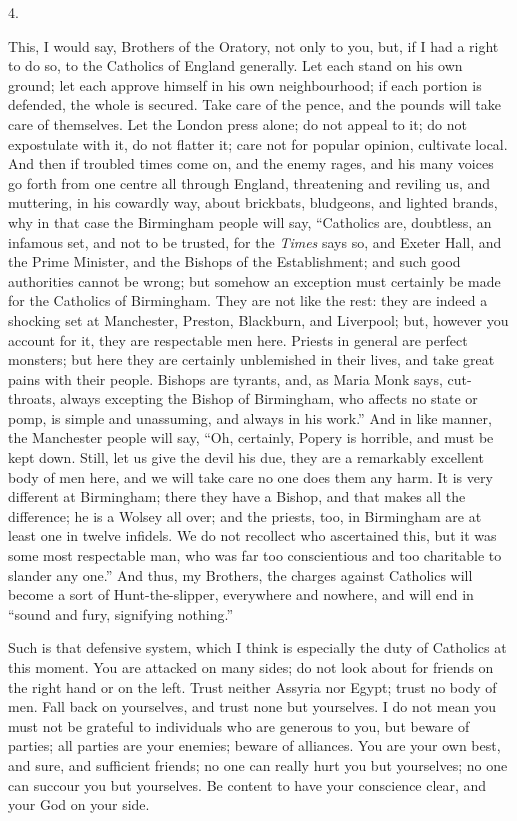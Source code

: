 4.

This, I would say, Brothers of the Oratory, not only
to you, but, if I had a right to do so, to the Catholics
of England generally. Let each stand on his own ground;
let each approve himself in his own neighbourhood; if
each portion is defended, the whole is secured. Take care
of the pence, and the pounds will take care of
themselves. Let the London press alone; do not appeal to
it; do not expostulate with it, do not flatter it; care
not for popular opinion, cultivate local. And then if
troubled times come on, and the enemy rages, and his many
voices go forth from one centre all through England,
threatening and reviling us, and muttering, in his
cowardly way, about brickbats, bludgeons, and lighted
brands, why in that case the Birmingham people will say,
``Catholics are, doubtless, an infamous set, and not
to be trusted, for the \emph{Times} says so, and Exeter
Hall, and the Prime Minister, and the Bishops of the
Establishment; and such good authorities cannot be wrong;
but somehow an exception must certainly be made for the
Catholics of Birmingham. They are not like the rest: they
are indeed a shocking set at Manchester, Preston,
Blackburn, and Liverpool; but, however you account for
it, they are respectable men here. Priests in general are
perfect monsters; but here they are certainly unblemished
in their lives, and take great pains with their people.
Bishops are tyrants, and, as Maria Monk says,
cut-throats, always excepting the Bishop of Birmingham,
who affects no state or pomp, is simple and unassuming,
and always in his work.'' And in like manner, the
Manchester people will say, ``Oh, certainly, Popery
is horrible, and must be kept down. Still, let us give
the devil his due, they are a remarkably excellent body
of men here, and we will take care no one does them any
harm. It is very different at Birmingham; there they have
a Bishop, and that makes all the difference; he is a
Wolsey all over; and the priests, too, in Birmingham are
at least one in twelve infidels. We do not recollect who
ascertained this, but it was some most respectable man,
who was far too conscientious and too charitable to
slander any one.'' And thus, my Brothers, the charges
against Catholics will become a sort of Hunt-the-slipper,
everywhere and nowhere, and will end in ``sound and
fury, signifying nothing.''

Such is that defensive system, which I think is
especially the duty of Catholics at this moment. You are
attacked on many sides; do not look about for friends on
the right hand or on the left. Trust neither Assyria nor
Egypt; trust no body of men. Fall back on yourselves, and
trust none but yourselves. I do not mean you must not be
grateful to individuals who are generous to you, but
beware of parties; all parties are your enemies; beware
of alliances. You are your own best, and sure, and
sufficient friends; no one can really hurt you but
yourselves; no one can succour you but yourselves. Be
content to have your conscience clear, and your God on
your side.

